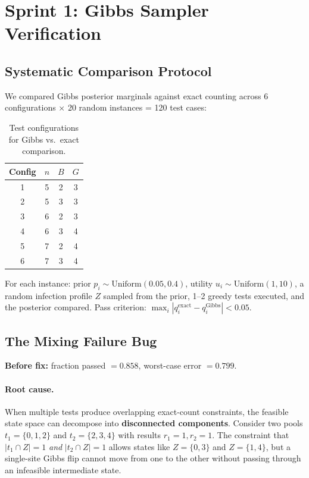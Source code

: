 \documentclass[11pt,a4paper]{article}
\begin{document}
\section{Sprint 1: Gibbs Sampler Verification}
\label{sec:gibbs}

\subsection{Systematic Comparison Protocol}

We compared Gibbs posterior marginals against exact counting across 6 configurations $\times$ 20 random instances = 120 test cases:

\begin{table}[h]
\centering
\caption{Test configurations for Gibbs vs.\ exact comparison.}
\label{tab:gibbs_configs}
\begin{tabular}{cccc}
\toprule
\textbf{Config} & $n$ & $B$ & $G$ \\
\midrule
1 & 5 & 2 & 3 \\
2 & 5 & 3 & 3 \\
3 & 6 & 2 & 3 \\
4 & 6 & 3 & 4 \\
5 & 7 & 2 & 4 \\
6 & 7 & 3 & 4 \\
\bottomrule
\end{tabular}
\end{table}

For each instance: prior $p_i \sim \text{Uniform}(0.05, 0.4)$, utility $u_i \sim \text{Uniform}(1, 10)$, a random infection profile $Z$ sampled from the prior, 1--2 greedy tests executed, and the posterior compared. Pass criterion: $\max_i |q^{\text{exact}}_i - q^{\text{Gibbs}}_i| < 0.05$.


\subsection{The Mixing Failure Bug}

\begin{finding}
\textbf{Before fix:} fraction passed $= 0.858$, worst-case error $= 0.799$.
\end{finding}

\paragraph{Root cause.}
When multiple tests produce overlapping exact-count constraints, the feasible state space can decompose into \textbf{disconnected components}.
Consider two pools $t_1 = \{0,1,2\}$ and $t_2 = \{2,3,4\}$ with results $r_1 = 1, r_2 = 1$.
The constraint that $|t_1 \cap Z| = 1$ \emph{and} $|t_2 \cap Z| = 1$ allows states like $Z = \{0,3\}$ and $Z = \{1,4\}$, but a single-site Gibbs flip cannot move from one to the other without passing through an infeasible intermediate state.
\end{document}

